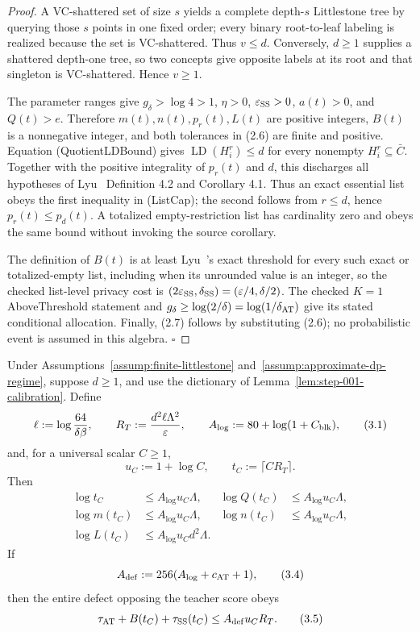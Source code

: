 \begin{proof}
A VC-shattered set of size \(s\) yields a complete depth-\(s\)
Littlestone tree by querying those \(s\) points in one fixed order; every
binary root-to-leaf labeling is realized because the set is VC-shattered.
Thus \(v\le d\). Conversely, \(d\ge1\) supplies a shattered depth-one tree,
so two concepts give opposite labels at its root and that singleton is
VC-shattered. Hence \(v\ge1\).

The parameter ranges give \(g_\delta>\log4>1\), \(\eta>0\),
\(\varepsilon_{\rm SS}>0\), \(a(t)>0\), and \(Q(t)>e\). Therefore
\(m(t),n(t),p_r(t),L(t)\) are positive integers, \(B(t)\) is a nonnegative
integer, and both tolerances in (2.6) are finite and positive. Equation
(QuotientLDBound) gives
\(\operatorname{LD}(H_i^r)\le d\) for every nonempty
\(H_i^r\subseteq\bar C\). Together with the positive integrality of
\(p_r(t)\) and \(d\), this discharges all hypotheses of Lyu~\citep{lyu2025} Definition 4.2
and Corollary 4.1. Thus an exact essential list obeys the first inequality
in (ListCap); the second follows from \(r\le d\), hence
\(p_r(t)\le p_d(t)\). A totalized empty-restriction list has cardinality zero
and obeys the same bound without invoking the source corollary.

The definition of \(B(t)\) is at least Lyu~\citep{lyu2025}'s exact threshold for every such
exact or totalized-empty list, including when its unrounded value is an
integer, so the checked list-level privacy cost is
\((2\varepsilon_{\rm SS},\delta_{\rm SS})
=(\varepsilon/4,\delta/2)\). The checked \(K=1\) AboveThreshold statement
and \(g_\delta\ge\log(2/\delta)=\log(1/\delta_{\rm AT})\) give its stated
conditional allocation. Finally, (2.7) follows by substituting (2.6); no
probabilistic event is assumed in this algebra. \(\square\)


\end{proof}

\begin{lemma}\label{lem:step-001-envelope}
Under Assumptions~\ref{assump:finite-littlestone}
and~\ref{assump:approximate-dp-regime}, suppose \(d\ge1\), and use the
dictionary of Lemma~\ref{lem:step-001-calibration}. Define
\[
\ell:=\log\frac{64}{\delta\beta},
\qquad
R_T:=\frac{d^2\ell\Lambda^2}{\varepsilon},
\qquad
A_{\log}:=80+\log(1+C_{\rm blk}),
\tag{3.1}
\]
and, for a universal scalar \(C\ge1\),
\[
u_C:=1+\log C,
\qquad t_C:=\lceil CR_T\rceil.
\tag{3.2}
\]
Then
\[
\begin{aligned}
\log t_C&\le A_{\log}u_C\Lambda,&
\log Q(t_C)&\le A_{\log}u_C\Lambda,\\
\log m(t_C)&\le A_{\log}u_C\Lambda,&
\log n(t_C)&\le A_{\log}u_C\Lambda,\\
\log L(t_C)&\le A_{\log}u_Cd^2\Lambda.
\end{aligned}
\tag{3.3}
\]
If
\[
A_{\rm def}:=256(A_{\log}+c_{\rm AT}+1),
\tag{3.4}
\]
then the entire defect opposing the teacher score obeys
\[
\tau_{\rm AT}+B(t_C)+\tau_{\rm SS}(t_C)
\le A_{\rm def}u_CR_T.
\tag{3.5}
\]


\end{lemma}

